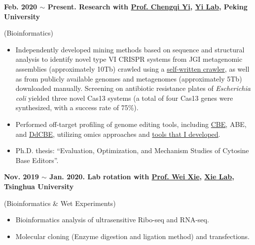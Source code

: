 \textbf{
    Feb. 2020 $\sim$ Present. Research with \href{https://www.bio.pku.edu.cn/enhomes/news/teacher_dis/91.html}{Prof. Chengqi Yi}, \href{https://yilab.org.cn/}{Yi Lab}, Peking University
}

(Bioinformatics)

\begin{itemize}
    \item Independently developed mining methods based on sequence and structural analysis to 
    identify novel type VI CRISPR systems from 
    JGI metagenomic assemblies (approximately 10Tb) crawled using a \href{https://github.com/hermanzhaozzzz/bioat/blob/master/src/bioat/metatools.py}{self-written crawler}, 
    as well as from publicly available genomes and metagenomes (approximately 5Tb) downloaded manually.
    Screening on antibiotic resistance plates of \textit{Escherichia coli} 
    yielded three novel Cas13 systems (a total of four Cas13 genes were synthesized, 
    with a success rate of 75\%).

    \item Performed off-target profiling of genome editing tools, including 
    \href{https://scholar.google.com/citations?view_op=view_citation&hl=zh-CN&user=ojSVoWQAAAAJ&citation_for_view=ojSVoWQAAAAJ:zYLM7Y9cAGgC}{CBE}, 
    ABE, 
    and \href{https://scholar.google.com/citations?view_op=view_citation&hl=zh-CN&user=ojSVoWQAAAAJ&citation_for_view=ojSVoWQAAAAJ:Y0pCki6q_DkC}{DdCBE}, 
    utilizing omics approaches 
    and \href{https://github.com/hermanzhaozzzz?tab=repositories&q=snakepipes&type=&language=&sort=}
    {tools that I developed}.
    \item Ph.D. thesis: ``Evaluation, Optimization, and Mechanism Studies of Cytosine Base Editors''.
    
\end{itemize}

\textbf{
    Nov. 2019 $\sim$ Jan. 2020. Lab rotation with \href{https://life.tsinghua.edu.cn/lifeen/info/1034/1077.htm}{Prof. Wei Xie}, \href{http://www.xielab.org.cn/}{Xie Lab}, Tsinghua University
}

(Bioinformatics \& Wet Experiments)

\begin{itemize}
    \item Bioinformatics analysis of ultrasensitive Ribo-seq and RNA-seq.
    \item Molecular cloning (Enzyme digestion and ligation method) and transfections.
\end{itemize}

